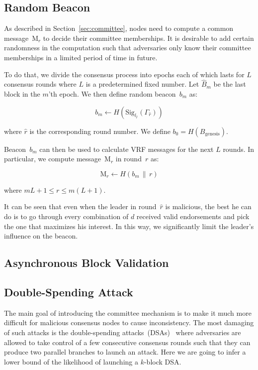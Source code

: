 \documentclass{article}
\begin{document}
\subsection{Random Beacon}

As described in Section~\ref{sec:committee}, nodes need to compute a common message~$\textrm{M}_r$ to decide their committee memberships. It is desirable to add certain randomness in the computation such that adversaries only know their committee memberships in a limited period of time in future.

To do that, we divide the consensus process into epochs each of which lasts for $L$ consensus rounds where $L$ is a predetermined fixed number. Let $\hat{B}_m$ be the last block in the $m$'th epoch. We then define random beacon~$b_m$ as:

\begin{equation}
    b_m \leftarrow H(\textrm{Sig}_{l_{\hat{r}}}(\Gamma_{\hat{r}}))
\end{equation}

where $\hat{r}$ is the corresponding round number. We define $b_0=H(B_{\textrm{genesis}})$.

Beacon~$b_m$ can then be used to calculate VRF messages for the next $L$ rounds. In particular, we compute message~$\textrm{M}_r$ in round~$r$ as:

\begin{equation}
    \textrm{M}_r \leftarrow H(b_m\,\|\,r)
\end{equation}

where $mL+1\leq r\leq m(L+1)$.

It can be seen that even when the leader in round~$\hat{r}$ is malicious, the best he can do is to go through every combination of $d$ received valid endorsements and pick the one that maximizes his interest. In this way, we significantly limit the leader's influence on the beacon.

\subsection{Asynchronous Block Validation}
 

\subsection{Double-Spending Attack}
The main goal of introducing the committee mechanism is to make it much more difficult for malicious consensus nodes to cause inconsistency. The most damaging of such attacks is the double-spending attacks~(DSAs)~\cite{Sat08} where adversaries are allowed to take control of a few consecutive consensus rounds such that they can produce two parallel branches to launch an attack. Here we are going to infer a lower bound of the likelihood of launching a $k$-block DSA.
\end{document}
